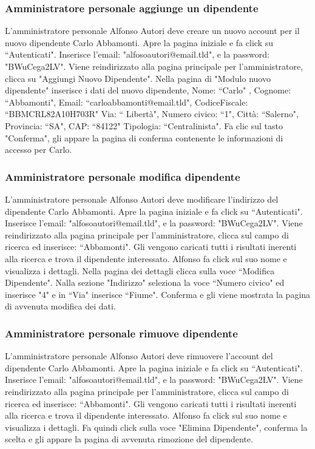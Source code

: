 \documentclass[12pt,a4paper]{article}
\begin{document}
\subsubsection{Amministratore personale aggiunge un dipendente}
L'amministratore personale Alfonso Autori deve creare un nuovo account per il nuovo dipendente Carlo Abbamonti.
Apre la pagina iniziale e fa click su ``Autenticati".
Inserisce l'email: "alfosoautori@email.tld", e la password: "BWuCega2LV".
Viene reindirizzato alla pagina principale per l'amministratore, clicca su "Aggiungi Nuovo Dipendente".
Nella pagina di "Modulo nuovo dipendente" inserisce i dati del nuovo dipendente,
Nome: ``Carlo" , Cognome: ``Abbamonti", 
Email: ``carloabbamonti@email.tld",
CodiceFiscale: ``BBMCRL82A10H703R"
Via: `` Libertà", Numero civico: ``1", Città: ``Salerno", Provincia: ``SA", CAP: ``84122"
Tipologia: ``Centralinista".
Fa clic sul tasto "Conferma", gli appare la pagina di conferma contenente le informazioni di accesso per Carlo.

\subsubsection{Amministratore personale modifica dipendente}
L'amministratore personale Alfonso Autori deve modificare l'indirizzo del dipendente Carlo Abbamonti.
Apre la pagina iniziale e fa click su ``Autenticati".
Inserisce l'email: "alfosoautori@email.tld", e la password: "BWuCega2LV".
Viene reindirizzato alla pagina principale per l'amministratore, 
clicca sul campo di ricerca ed inserisce: ``Abbamonti".
Gli vengono caricati tutti i risultati inerenti alla ricerca e trova il dipendente interessato. Alfonso fa click sul suo nome e visualizza i dettagli.
Nella pagina dei dettagli clicca sulla voce ``Modifica Dipendente".
Nalla sezione "Indirizzo" seleziona la voce ``Numero civico" ed inserisce "4" e in ``Via" inserisce ``Fiume".
Conferma e gli viene mostrata la pagina di avvenuta modifica dei dati.

\subsubsection{Amministratore personale rimuove dipendente}
L'amministratore personale Alfonso Autori deve rimuovere l'account del dipendente Carlo Abbamonti.
Apre la pagina iniziale e fa click su ``Autenticati".
Inserisce l'email: "alfosoautori@email.tld", e la password: "BWuCega2LV".
Viene reindirizzato alla pagina principale per l'amministratore, 
clicca sul campo di ricerca ed inserisce: ``Abbamonti".
Gli vengono caricati tutti i risultati inerenti alla ricerca e trova il dipendente interessato. Alfonso fa click sul suo nome e visualizza i dettagli.
Fa quindi click sulla voce "Elimina Dipendente", conferma la scelta e gli appare la pagina di avvenuta rimozione del dipendente.
\end{document}
